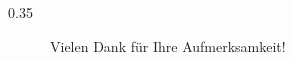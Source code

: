 %
%
%
%

\STANDARD{}
{
  \begin{columns}
    \begin{column}{0.35\textwidth}
      \begin{block}{~~~~~~Vielen Dank}
        \centering
        für Ihre Aufmerksamkeit!
      \end{block}
    \end{column}
  \end{columns}
}



